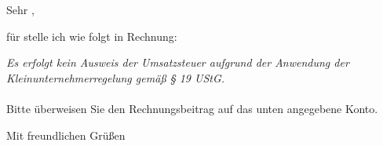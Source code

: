 \documentclass[DIN,fromalign=center,paper=a4,fontsize=11pt]{scrlttr2}
\begin{document}
\begin{letter}{ \\
\\
}
\opening{Sehr  ,}
für  stelle ich wie folgt in Rechnung:
\begin{Rechnung}[N]
\PositionEin
\TrennerAus




\end{Rechnung}
\textit{Es erfolgt kein Ausweis der Umsatzsteuer aufgrund der Anwendung der Kleinunternehmerregelung gemäß § 19 UStG.}\\\\
Bitte überweisen Sie den Rechnungsbeitrag auf das unten angegebene Konto.
\closing{Mit freundlichen Grüßen}
\end{letter}
\end{document}

